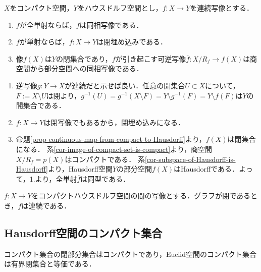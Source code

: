 \documentclass[uplatex,dvipdfmx]{jsreport}
\begin{document}
\begin{corollary}\label{cor-Compact-Hausdorff}
    $X$をコンパクト空間，$Y$をハウスドルフ空間とし，$f:X\to Y$を連続写像とする．
    \begin{enumerate}
        \item $f$が全単射ならば，$f$は同相写像である．
        \item $f$が単射ならば，$f:X\to Y$は閉埋め込みである．
        \item 像$f(X)$は$Y$の閉集合であり，$f$が引き起こす可逆写像$\overline{f}:X/R_f\to f(X)$は商空間から部分空間への同相写像である．
    \end{enumerate}
\end{corollary}
\begin{Proof}\mbox{}
    \begin{enumerate}
        \item 逆写像$g:Y\to X$が連続だと示せば良い．任意の開集合$U\subset X$について，$F:=X\setminus U$は閉より，$g^{-1}(U)=g^{-1}(X\setminus F)=Y\setminus g^{-1}(F)=Y\setminus f(F)$は$Y$の開集合である．
        \item $f:X\to Y$は閉写像でもあるから，閉埋め込みになる．
        \item 命題\ref{prop-continuous-map-from-compact-to-Hausdorff}より，$f(X)$は閉集合になる．
        系\ref{cor-image-of-compact-set-is-compact}より，商空間$X/R_f=p(X)$はコンパクトである．
        系\ref{cor-subspace-of-Hausdorff-is-Hausdorff}より，Hausdorff空間$Y$の部分空間$f(X)$はHausdorffである．よって，1.より，全単射$\overline{f}$は同型である．
    \end{enumerate}
\end{Proof}

\begin{proposition}[閉グラフ定理]
    $f:X\to Y$をコンパクトハウスドルフ空間の間の写像とする．グラフが閉であるとき，$f$は連続である．
\end{proposition}

\subsection{Hausdorff空間のコンパクト集合}

\begin{tcolorbox}[colframe=ForestGreen, colback=ForestGreen!10!white,breakable,colbacktitle=ForestGreen!40!white,coltitle=black,fonttitle=\bfseries\sffamily,
title=]
    コンパクト集合の閉部分集合はコンパクトであり，Euclid空間のコンパクト集合は有界閉集合と等価である．
\end{tcolorbox}
\end{document}
